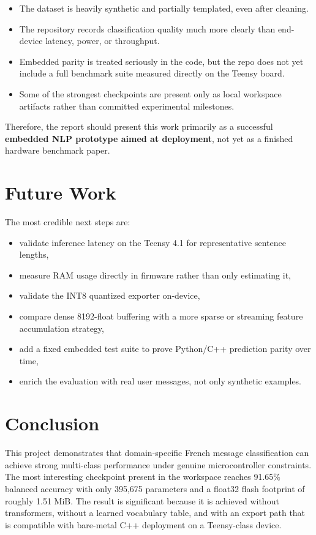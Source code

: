 \documentclass[11pt,a4paper]{article}
\begin{document}
\begin{itemize}
    \item The dataset is heavily synthetic and partially templated, even after cleaning.
    \item The repository records classification quality much more clearly than end-device latency, power, or throughput.
    \item Embedded parity is treated seriously in the code, but the repo does not yet include a full benchmark suite measured directly on the Teensy board.
    \item Some of the strongest checkpoints are present only as local workspace artifacts rather than committed experimental milestones.
\end{itemize}

Therefore, the report should present this work primarily as a successful \textbf{embedded NLP prototype aimed at deployment}, not yet as a finished hardware benchmark paper.

\section{Future Work}

The most credible next steps are:

\begin{itemize}
    \item validate inference latency on the Teensy 4.1 for representative sentence lengths,
    \item measure RAM usage directly in firmware rather than only estimating it,
    \item validate the INT8 quantized exporter on-device,
    \item compare dense 8192-float buffering with a more sparse or streaming feature accumulation strategy,
    \item add a fixed embedded test suite to prove Python/C++ prediction parity over time,
    \item enrich the evaluation with real user messages, not only synthetic examples.
\end{itemize}

\section{Conclusion}

This project demonstrates that domain-specific French message classification can achieve strong multi-class performance under genuine microcontroller constraints. The most interesting checkpoint present in the workspace reaches 91.65\% balanced accuracy with only 395{,}675 parameters and a float32 flash footprint of roughly 1.51 MiB. The result is significant because it is achieved without transformers, without a learned vocabulary table, and with an export path that is compatible with bare-metal C++ deployment on a Teensy-class device.
\end{document}
